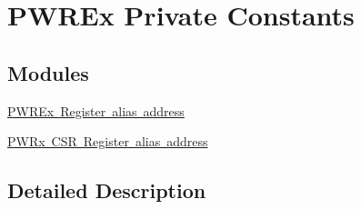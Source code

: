 \hypertarget{group___p_w_r_ex___private___constants}{}\section{P\+W\+R\+Ex Private Constants}
\label{group___p_w_r_ex___private___constants}
\subsection*{Modules}
\begin{DoxyCompactItemize}
\item 
\mbox{\hyperlink{group___p_w_r_ex__register__alias__address}{P\+W\+R\+Ex Register alias address}}
\item 
\mbox{\hyperlink{group___p_w_r_ex___c_s_r__register__alias}{P\+W\+Rx C\+S\+R Register alias address}}
\end{DoxyCompactItemize}


\subsection{Detailed Description}
